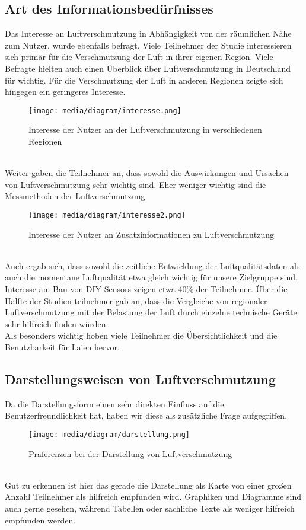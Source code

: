 \subsection{Art des Informationsbedürfnisses}
Das Interesse an \gls{Luftverschmutzung} in Abhängigkeit von der räumlichen Nähe zum Nutzer, wurde ebenfalls befragt.
Viele Teilnehmer der Studie interessieren sich primär für die Verschmutzung der Luft in ihrer eigenen Region. Viele Befragte hielten auch einen Überblick über \gls{Luftverschmutzung} in Deutschland für wichtig. Für die Verschmutzung der Luft in anderen Regionen zeigte sich hingegen ein geringeres Interesse.
\\
\begin{figure}[h]
    \centering
    \texttt{[image: media/diagram/interesse.png]}
    \caption{Interesse der Nutzer an der Luftverschmutzung in verschiedenen Regionen}
\end{figure}
\\
Weiter gaben die Teilnehmer an,  dass sowohl die Auswirkungen und Ursachen von \gls{Luftverschmutzung} sehr wichtig sind. Eher weniger wichtig sind die Messmethoden der Luftverschmutzung
\\
\begin{figure}[h]
    \centering
    \texttt{[image: media/diagram/interesse2.png]}
    \caption{Interesse der Nutzer an Zusatzinformationen zu Luftverschmutzung}
\end{figure}
\\
Auch ergab sich, dass sowohl die zeitliche Entwicklung der Luftqualitätsdaten als auch die momentane Luftqualität etwa gleich wichtig für unsere Zielgruppe sind. Interesse am Bau von \gls{DIY}-\glspl{Sensor} zeigen etwa 40\%  der Teilnehmer.
Über die Hälfte der Studien-teilnehmer gab an, dass die Vergleiche von regionaler \gls{Luftverschmutzung} mit der Belastung der Luft durch einzelne technische Geräte sehr hilfreich finden würden.
\\
Als besonders wichtig hoben viele Teilnehmer die Übersichtlichkeit und die Benutzbarkeit für Laien hervor.

\subsection{Darstellungsweisen von Luftverschmutzung}
Da die Darstellungsform einen sehr direkten Einfluss auf die Benutzerfreundlichkeit hat, haben wir diese als zusätzliche Frage aufgegriffen.
\\
\begin{figure}[h]
    \centering
    \texttt{[image: media/diagram/darstellung.png]}
    \caption{Präferenzen bei der Darstellung von Luftverschmutzung}
\end{figure}
\\
Gut zu erkennen ist hier das gerade die Darstellung als Karte von einer großen Anzahl Teilnehmer als hilfreich empfunden wird.
Graphiken und Diagramme sind auch gerne gesehen, während Tabellen oder sachliche Texte als weniger hilfreich empfunden werden.

